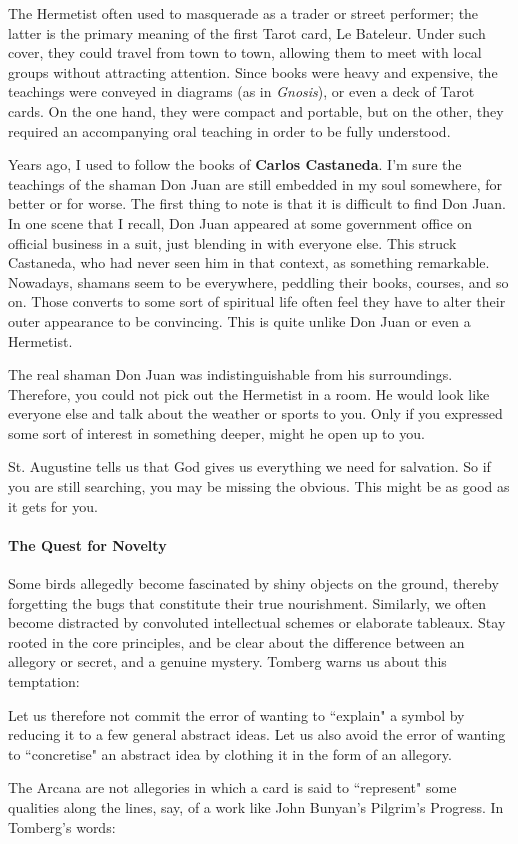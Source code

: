 The Hermetist often used to masquerade as a trader or street performer; the latter is the primary meaning of the first Tarot card, Le Bateleur. Under such cover, they could travel from town to town, allowing them to meet with local groups without attracting attention. Since books were heavy and expensive, the teachings were conveyed in diagrams (as in \emph{Gnosis}), or even a deck of Tarot cards. On the one hand, they were compact and portable, but on the other, they required an accompanying oral teaching in order to be fully understood.

Years ago, I used to follow the books of \textbf{Carlos Castaneda}. I'm sure the teachings of the shaman Don Juan are still embedded in my soul somewhere, for better or for worse. The first thing to note is that it is difficult to find Don Juan. In one scene that I recall, Don Juan appeared at some government office on official business in a suit, just blending in with everyone else. This struck Castaneda, who had never seen him in that context, as something remarkable. Nowadays, shamans seem to be everywhere, peddling their books, courses, and so on. Those converts to some sort of spiritual life often feel they have to alter their outer appearance to be convincing. This is quite unlike Don Juan or even a Hermetist.

The real shaman Don Juan was indistinguishable from his surroundings. Therefore, you could not pick out the Hermetist in a room. He would look like everyone else and talk about the weather or sports to you. Only if you expressed some sort of interest in something deeper, might he open up to you.

St. Augustine tells us that God gives us everything we need for salvation. So if you are still searching, you may be missing the obvious. This might be as good as it gets for you.

\paragraph{The Quest for Novelty}
Some birds allegedly become fascinated by shiny objects on the ground, thereby forgetting the bugs that constitute their true nourishment. Similarly, we often become distracted by convoluted intellectual schemes or elaborate tableaux. Stay rooted in the core principles, and be clear about the difference between an allegory or secret, and a genuine mystery. Tomberg warns us about this temptation:

\begin{quotex}
Let us therefore not commit the error of wanting to ``explain" a symbol by reducing it to a few general abstract ideas. Let us also avoid the error of wanting to ``concretise" an abstract idea by clothing it in the form of an allegory. 

\end{quotex}
The Arcana are not allegories in which a card is said to ``represent" some qualities along the lines, say, of a work like John Bunyan's Pilgrim's Progress. In Tomberg's words:

